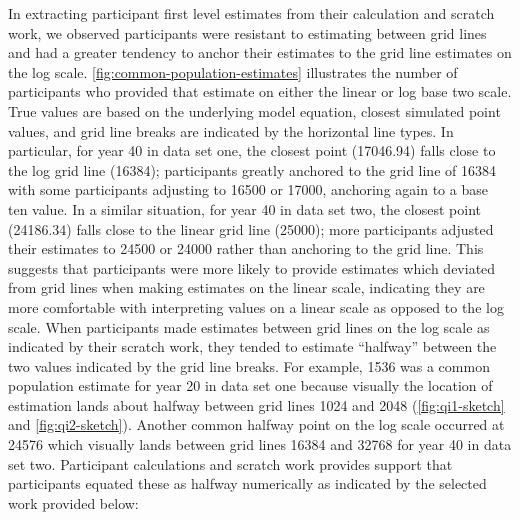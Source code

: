 \documentclass[print]{nuthesis}
\begin{document}
In extracting participant first level estimates from their calculation and scratch work, we observed participants were resistant to estimating between grid lines and had a greater tendency to anchor their estimates to the grid line estimates on the log scale.
\cref{fig:common-population-estimates} illustrates the number of participants who provided that estimate on either the linear or log base two scale.
True values are based on the underlying model equation, closest simulated point values, and grid line breaks are indicated by the horizontal line types.
In particular, for year 40 in data set one, the closest point (17046.94) falls close to the log grid line (16384); participants greatly anchored to the grid line of 16384 with some participants adjusting to 16500 or 17000, anchoring again to a base ten value.
In a similar situation, for year 40 in data set two, the closest point (24186.34) falls close to the linear grid line (25000); more participants adjusted their estimates to 24500 or 24000 rather than anchoring to the grid line.
This suggests that participants were more likely to provide estimates which deviated from grid lines when making estimates on the linear scale, indicating they are more comfortable with interpreting values on a linear scale as opposed to the log scale.
When participants made estimates between grid lines on the log scale as indicated by their scratch work, they tended to estimate ``halfway'' between the two values indicated by the grid line breaks.
For example, 1536 was a common population estimate for year 20 in data set one because visually the location of estimation lands about halfway between grid lines 1024 and 2048 (\cref{fig:qi1-sketch} and \cref{fig:qi2-sketch}).
Another common halfway point on the log scale occurred at 24576 which visually lands between grid lines 16384 and 32768 for year 40 in data set two.
Participant calculations and scratch work provides support that participants equated these as halfway numerically as indicated by the selected work provided below:
\end{document}
